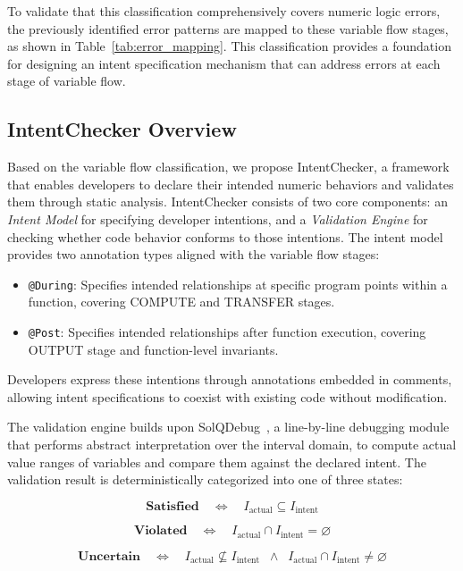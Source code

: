 \documentclass[pdflatex,sn-basic]{sn-jnl}%
\theoremstyle{thmstyleone}%
\theoremstyle{thmstyletwo}%
\theoremstyle{thmstylethree}%
\begin{document}
To validate that this classification comprehensively covers numeric logic errors,
the previously identified error patterns are mapped to these variable flow stages, as shown in Table~\ref{tab:error_mapping}.
This classification provides a foundation for designing an intent specification mechanism that can address errors at each stage of variable flow.

\subsection{IntentChecker Overview}

Based on the variable flow classification, we propose IntentChecker, a framework that enables developers to declare their intended numeric behaviors and validates them through static analysis.
IntentChecker consists of two core components: an \textit{Intent Model} for specifying developer intentions, and a \textit{Validation Engine} for checking whether code behavior conforms to those intentions.
The intent model provides two annotation types aligned with the variable flow stages:

\begin{itemize}
    \item \texttt{@During}: Specifies intended relationships at specific program points within a function, covering COMPUTE and TRANSFER stages.
    \item \texttt{@Post}: Specifies intended relationships after function execution, covering OUTPUT stage and function-level invariants.
\end{itemize}

Developers express these intentions through annotations embedded in comments, allowing intent specifications to coexist with existing code without modification.

The validation engine builds upon SolQDebug~\citep{solqdebug}, a line-by-line debugging module that performs abstract interpretation over the interval domain, to compute actual value ranges of variables and compare them against the declared intent.
The validation result is deterministically categorized into one of three states:

\[
  \textbf{Satisfied} \quad \Longleftrightarrow \quad
    I_{\text{actual}} \subseteq I_{\text{intent}}
\]

\[
  \textbf{Violated} \quad \Longleftrightarrow \quad
    I_{\text{actual}} \cap I_{\text{intent}} = \varnothing
\]

\[
  \textbf{Uncertain} \quad \Longleftrightarrow \quad
    I_{\text{actual}} \not\subseteq I_{\text{intent}}
    \;\;\wedge\;\; I_{\text{actual}} \cap I_{\text{intent}} \neq \varnothing
\]
\end{document}
